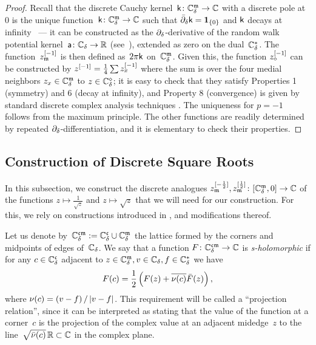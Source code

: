 \documentclass[12pt,oneside,english]{amsart}
\numberwithin{equation}{section}
\numberwithin{figure}{section}
\theoremstyle{plain}
\theoremstyle{plain}
\theoremstyle{plain}
\theoremstyle{plain}
\theoremstyle{remark}
\theoremstyle{definition}
\theoremstyle{plain}
\theoremstyle{plain}
\numberwithin{thm}{section}
\begin{document}
\begin{proof}
Recall that the 
discrete Cauchy kernel~$\mathsf{k} \colon {\mathbb{C}_{{\delta}}^{\mathfrak{m}}} \to \mathbb{C}$ with
a discrete pole at $0$ is the unique 
function~$\mathsf{k} \colon {\mathbb{C}_{{\delta}}^{\mathfrak{m}}} \to \mathbb{C}$ such that
${{\bar{\partial}}}_{{\delta}} \mathsf{k} = \mathbf{1}_{\left\{ 0 \right\}}$ and $\mathsf{k}$ decays at infinity
\cite{chelkak-smirnov-i, kenyon-i}~--- it can be constructed as the %
${\partial}_{{\delta}}$-derivative of the random walk potential 
kernel~$\mathsf{a} \colon {\mathbb{C}_{{\delta}}} \to \mathbb{R}$ (see~\cite{lawler-limic}), extended as zero 
on the dual~${\mathbb{C}_{{\delta}}^*}$.
The function~${z_{\mathfrak{m}}^{[{-1}]}}$ is then defined as~$2 \pi \mathsf{k}$ 
on~${\mathbb{C}_{{\delta}}^{\mathfrak{m}}}$.
Given this, the function ${z_{\diamond}^{[{-1}]}}$ can be constructed
by ${z^{[{-1}]}} =\frac{1}{4} \sum {z_{x}^{[{-1}]}}$
where the sum is over the four medial neighbors $z_{x} \in {\mathbb{C}_{{\delta}}^{\mathfrak{m}}}$
to $z \in {\mathbb{C}_{{\delta}}^{\diamond}}$; it is easy to check that
they satisfy Properties 1 (symmetry) and 6 (decay at infinity), and
Property 8 (convergence) is given by standard discrete complex analysis
techniques \cite{chelkak-smirnov-i}. The uniqueness for $p=-1$ follows
from the maximum principle. The other functions are readily determined
by repeated ${\partial}_{{\delta}}$-differentiation, and it is elementary to check 
their properties. 
\end{proof}

\subsection{\label{subsec:construction-of-disc-sqrts}Construction of Discrete
Square Roots}

In this subsection, we construct the discrete analogues 
${z_{\mathfrak{m}}^{[{-\frac{1}{2}}]}},
{z_{\mathfrak{m}}^{[{\frac{1}{2}}]}}
\colon {\left[ {\mathbb{C}_{{\delta}}^{\mathfrak{m}}},0 \right]} \to  \mathbb{C} $
of the functions %
$z \mapsto \frac{1}{\sqrt{z}}$ and $z \mapsto \sqrt{z}$
that we will need for our
construction. For this, we rely on constructions introduced in 
\cite{chelkak-hongler-izyurov,gheissari-hongler-park},
and modifications thereof.

Let us denote by~${\mathbb{C}_{{\delta}}^{\mathfrak{c}\mathfrak{m}}} := {\mathbb{C}_{{\delta}}^{\mathfrak{c}}} \cup {\mathbb{C}_{{\delta}}^{\mathfrak{m}}}$ the lattice formed 
by the corners and midpoints of edges of~${\mathbb{C}_{{\delta}}}$.
We say that a function $F \colon {\mathbb{C}_{{\delta}}^{\mathfrak{c}\mathfrak{m}}} \to \mathbb{C} $
is \emph{s-holomorphic} if for any $c\in{\mathbb{C}_{{\delta}}^{\mathfrak{c}}}$
adjacent to $z \in {\mathbb{C}_{{\delta}}^{\mathfrak{m}}} , v \in {\mathbb{C}_{{\delta}}} , f \in {\mathbb{C}_{{\delta}}^*}$
we have 
\begin{equation}
F(c) =\frac{1}{2}\left(F(z) 
+\overline{{\nu}(c)} \bar{F}(z) \right),\label{eq:s-holomorphicity}
\end{equation}
where ${\nu}(c) =\left(v-f\right)/\left|v-f\right|$. 
This requirement will be called a ``projection relation'', since
it can be interpreted as stating that the value of the 
function at a corner~$c$ is the projection of the complex value at an 
adjacent midedge~$z$ to the 
line~$\sqrt{\bar{{\nu}}(c)} \, \mathbb{R} \subset \mathbb{C}$ in the complex plane.
\end{document}
